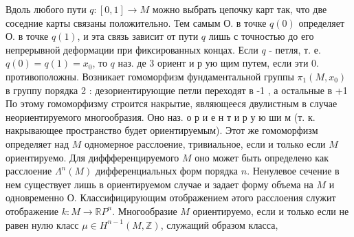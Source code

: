 \documentclass[10pt]{article}
\begin{document}
Вдоль любого пути $q:[0,1] \rightarrow M$ можно выбрать цепочку карт так, что две соседние карты связаны положительно. Тем самым О. в точке $q(0)$ определяет О. в точке $q(1)$, и эта связь зависит от пути $q$ лишь с точностью до его непрерывной деформации при фиксированных концах. Если $q$ - петля, т. е. $q(0)=q(1)=x_{0}$, то $q$ наз. де 3 ориент и р ую щим путем, если эти 0. противоположны. Возникает гомоморфизм фундаментальной группы $\pi_{1}\left(M, x_{0}\right)$ в группу порядка 2 : дезориентирующие петли переходят в -1 , а остальные в +1 По этому гомоморфизму строится накрытие, являющееся двулистным в случае неориентируемого многообразия. Оно наз. о р и е н т и р у ю ши м (т. к. накрывающее пространство будет ориентируемым). Этот же гомоморфизм определяет над $M$ одномерное расслоение, тривиальное, если и только если $M$ ориентируемо. Для диффференцируемого $M$ оно может быть определено как расслоение $\Lambda^{n}(M)$ дифференциальных форм порядка $n$. Ненулевое сечение в нем существует лишь в ориентируемом случае и задает форму объема на $M$ и одновременно О. Классифицирующим отображением әтого расслоения служит отображение $k: M \rightarrow \mathbb{R} P^{n}$. Многообразие $M$ ориентируемо, если и только если не равен нулю класс $\mu \in H^{n-1}(M, \mathbb{Z})$, служащий образом класса,
\end{document}
